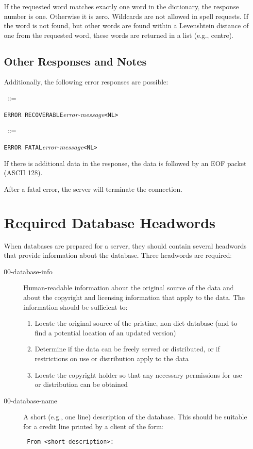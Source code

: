 \documentclass{article}
\newcommand{\NL}{\mbox{\tt <NL>\ }}
\newcommand{\note}{\bigskip\par\noindent}
\newcommand{\prd}[3][]{\noindent\begin{leftline}\hspace{1em}{\it #2}\ ::=\ %
  \begin{minipage}[t]{.64\textwidth}\raggedright #3\end{minipage}%
    \ifthenelse{\equal{#1}{}}{}%
    {\begin{minipage}[t]{.54\textwidth}\raggedright #1\end{minipage}%
      \vspace{1ex}}%
    \end{leftline}}
\newcommand{\lhs}[1]{{\it #1\/}}
\newcommand{\lit}[1]{{\tt #1}}
\begin{document}
\note If the requested word matches exactly one word in the dictionary, the
response number is one.  Otherwise it is zero.  Wildcards are not allowed
in spell requests.  If the word is not found, but other words are found
within a Levenshtein distance of one from the requested word, these words
are returned in a list (e.g., centre).

\subsection{Other Responses and Notes}

Additionally, the following error responses are possible:

\prd{error}{\lit{ERROR RECOVERABLE}\lhs{error-message}\NL}
\prd{error}{\lit{ERROR FATAL}\lhs{error-message}\NL}

\note If there is additional data in the response, the data is followed by
an EOF packet (ASCII 128).

After a fatal error, the server will terminate the connection.

\section{Required Database Headwords}

When databases are prepared for a server, they should contain several
headwords that provide information about the database.  Three headwords are
required:
\begin{description}
\item[00-database-info] Human-readable information about the original
  source of the data and about the copyright and licensing information that
  apply to the data.  The information should be sufficient to:
  \begin{enumerate}
  \item Locate the original source of the pristine, non-dict database (and
    to find a potential location of an updated version)
  \item Determine if the data can be freely served or distributed, or if
    restrictions on use or distribution apply to the data
  \item Locate the copyright holder so that any necessary permissions for
    use or distribution can be obtained
  \end{enumerate}
\item[00-database-name] A short (e.g., one line) description of the
  database.  This should be suitable for a credit line printed by a client
  of the form:
  \begin{center}\tt
    From <short-description>:
  \end{center}
\end{description}
\end{document}
